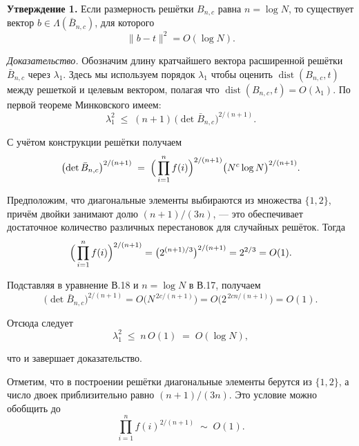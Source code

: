 \textbf{Утверждение 1.} Если размерность решётки $B_{n,c}$ равна
$n = \log N$, то существует вектор $b\in\Lambda(\bar B_{n,c})$, для которого
\begin{equation}
\lVert b - t\rVert^{2} = O(\log N).
\end{equation}

\textit{Доказательство.}
Обозначим длину кратчайшего вектора расширенной решётки $\bar B_{n,c}$ через
$\lambda_{1}$. Здесь мы используем порядок $\lambda_{1}$ чтобы оценить
$\operatorname{dist}(B_{n,c},t)$ между решеткой и целевым вектором, полагая что
$\operatorname{dist}(B_{n,c},t)=O(\lambda_{1})$. По первой теореме Минковского
имеем:
\begin{equation}
\lambda_{1}^{2}
\;\le\;
(n+1)\,\bigl(\det\bar B_{n,c}\bigr)^{2/(n+1)}.
\end{equation}

\noindent С учётом конструкции решётки получаем
\begin{equation}
\bigl(\det\bar B_{n,c}\bigr)^{2/(n+1)}
\;=\;
\Bigl(\,\prod_{i=1}^{n} f(i)\Bigr)^{2/(n+1)}
\bigl(N^{c}\log N\bigr)^{2/(n+1)} .
\end{equation}

\noindent Предположим, что диагональные элементы выбираются из множества $\{1,2\}$,
причём двойки занимают долю $(n+1)/(3n)$, — это обеспечивает достаточное
количество различных перестановок для случайных решёток. Тогда
\begin{equation}
\Bigl(\,\prod_{i=1}^{n} f(i)\Bigr)^{2/(n+1)}
  = \bigl(2^{(n+1)/3}\bigr)^{2/(n+1)}
  = 2^{2/3}
  = O(1).
\end{equation}

\noindent Подставляя в уравнение В.18 и $n=\log N$ в В.17, получаем
\begin{equation}
\bigl(\det\bar B_{n,c}\bigr)^{2/(n+1)}
  = O\!\bigl(N^{\,2c/(n+1)}\bigr)
  = O\!\bigl(2^{\,2cn/(n+1)}\bigr)
  = O(1).
\end{equation}

\noindent Отсюда следует
\begin{equation}
\lambda_{1}^{2} \;\le\; n\,O(1) \;=\; O(\log N),
\end{equation}

\noindent что и завершает доказательство.

Отметим, что в построении решётки диагональные элементы берутся из $\{1,2\}$, а
число двоек приблизительно равно $(n+1)/(3n)$. Это условие можно обобщить до
\begin{equation}
\prod_{i=1}^{n} f(i)^{2/(n+1)} \;\sim\; O(1).
\end{equation}

